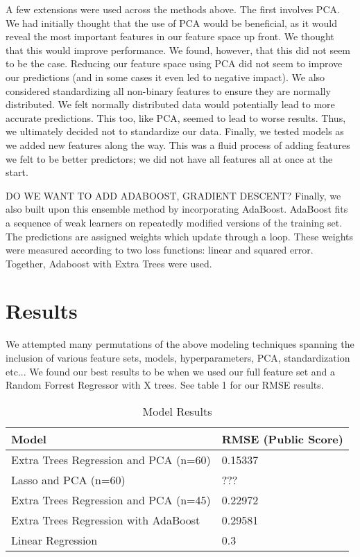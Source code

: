 \documentclass[11pt, oneside]{article}   	%
\begin{document}
A few extensions were used across the methods above. The first involves PCA. We had initially thought that the use of PCA would be beneficial, as it would reveal the most important features in our feature space up front. We thought that this would improve performance. We found, however, that this did not seem to be the case. Reducing our feature space using PCA did not seem to improve our predictions (and in some cases it even led to negative impact). We also considered standardizing all non-binary features to ensure they are normally distributed. We felt normally distributed data would potentially lead to more accurate predictions. This too, like PCA, seemed to lead to worse results. Thus, we ultimately decided not to standardize our data. Finally, we tested models as we added new features along the way. This was a fluid process of adding features we felt to be better predictors; we did not have all features all at once at the start.

DO WE WANT TO ADD ADABOOST, GRADIENT DESCENT? Finally, we also built upon this ensemble method by incorporating AdaBoost. AdaBoost fits a sequence of weak learners on repeatedly modified versions of the training set. The predictions are assigned weights which update through a loop. These weights were measured according to two loss functions: linear and squared error. Together, Adaboost with Extra Trees were used.



\section{Results}
We attempted many permutations of the above modeling techniques spanning the inclusion of various feature sets, models, hyperparameters, PCA, standardization etc... We found our best results to be when we used our full feature set and a Random Forrest Regressor with X trees. See table 1 for our RMSE results. 

\begin{table}[]
\centering

\label{my-label}
\begin{tabular}{@{}ll@{}}
\toprule
\textbf{Model} & \textbf{RMSE (Public Score)} \\ \midrule
Extra Trees Regression and PCA (n=60)  & 0.15337  \\
Lasso and PCA (n=60)  & ???  \\
Extra Trees Regression and PCA (n=45)   & 0.22972  \\
Extra Trees Regression with AdaBoost  & 0.29581  \\
Linear Regression & 0.3  \\ \bottomrule
\end{tabular}
\caption{Model Results}
\end{table}
\end{document}
